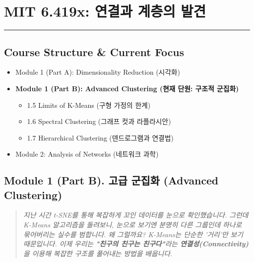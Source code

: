 \documentclass[11pt,a4paper]{book}
\theoremstyle{definition}
\begin{document}
\chapter{MIT 6.419x: 연결과 계층의 발견}
\label{ch:lecture2}


\vspace{1cm}
\hrule
\vspace{1cm}

\section*{Course Structure \& Current Focus}
\begin{itemize}
    \item Module 1 (Part A): Dimensionality Reduction (시각화)
    \item \textbf{\textcolor{mainblue}{Module 1 (Part B): Advanced Clustering (현재 단원: 구조적 군집화)}}
    \begin{itemize}
        \item 1.5 Limits of K-Means (구형 가정의 한계)
        \item 1.6 Spectral Clustering (그래프 컷과 라플라시안)
        \item 1.7 Hierarchical Clustering (덴드로그램과 연결법)
    \end{itemize}
    \item Module 2: Analysis of Networks (네트워크 과학)
\end{itemize}


\section{Module 1 (Part B). 고급 군집화 (Advanced Clustering)}

\begin{quote}
\textit{지난 시간 t-SNE를 통해 복잡하게 꼬인 데이터를 눈으로 확인했습니다. 그런데 K-Means 알고리즘을 돌려보니, 눈으로 보기엔 분명히 다른 그룹인데 하나로 묶어버리는 실수를 범합니다. 왜 그럴까요? K-Means는 단순한 '거리'만 보기 때문입니다. 이제 우리는 \textbf{"친구의 친구는 친구다"}라는 \textbf{연결성(Connectivity)}을 이용해 복잡한 구조를 풀어내는 방법을 배웁니다.}
\end{quote}
\end{document}
